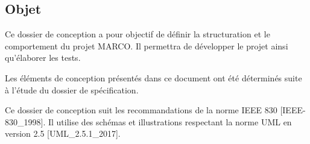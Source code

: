 \subsection{Objet} %

Ce dossier de conception a pour objectif de définir la structuration et le comportement du
projet \gls{MARCO}. Il permettra de développer le projet ainsi qu’élaborer les tests. \newline

Les éléments de conception présentés dans ce document ont été déterminés suite à l’étude du
dossier de spécification. \newline

Ce dossier de conception suit les recommandations de la norme IEEE 830 [IEEE-830\_1998]. Il
utilise des schémas et illustrations respectant la norme UML en version 2.5 [UML\_2.5.1\_2017].